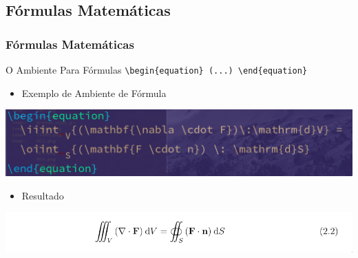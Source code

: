 \documentclass{beamer}
\begin{document}
\begin{frame}[fragile]
  \section{Fórmulas Matemáticas}
  \frametitle{Fórmulas Matemáticas}
  \begin{center}
    \Large{O Ambiente Para Fórmulas \verb+\begin{equation} (...) \end{equation}+}
  \end{center}
  \vspace{0.5cm}

   \begin{itemize}
  \item Exemplo de Ambiente de Fórmula
  \end{itemize}
  \vspace{0.2cm}
 \begin{center}
   \includegraphics[scale=0.30]{../Imagens/A2I71.png} \\
   \vspace{0.2cm}
   \begin{itemize}
  \item Resultado
  \end{itemize}
  \vspace{0.2cm}
   \includegraphics[scale=0.40]{../Imagens/A2I72.png}
\end{center}
\end{frame}
\end{document}
